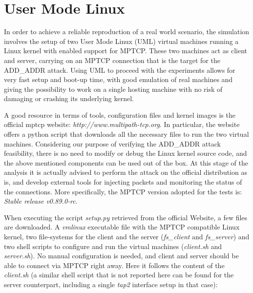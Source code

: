 \section{User Mode Linux}
In order to achieve a reliable reproduction of a real world scenario, the simulation involves the setup of two User Mode Linux (UML) virtual machines running a Linux kernel with enabled support for MPTCP. These two machines act as client and server, carrying on an MPTCP connection that is the target for the ADD\_ADDR attack. 
Using UML to proceed with the experiments allows for very fast setup and boot-up time, with good emulation of real machines and giving the possibility to work on a single hosting machine with no risk of damaging or crashing its underlying kernel.

A good resource in terms of tools, configuration files and kernel images is the official mptcp website:
\textit{http://www.multipath-tcp.org}. In particular, the website offers a python script that downloads all the necessary files to run the two virtual machines. Considering our purpose of verifying the ADD\_ADDR attack feasibility, there is no need to modify or debug the Linux kernel source code, and the above mentioned components can be used out of the box. At this stage of the analysis it is actually advised to perform the attack on the official distribution as is, and develop external tools for injecting packets and monitoring the status of the connections. More specifically, the MPTCP version adopted for the tests is: \textit{Stable release v0.89.0-rc}.

When executing the script \textit{setup.py} retrieved from the official Website, a few files are downloaded. A \textit{vmlinux} executable file with the MPTCP compatible Linux kernel, two file-systems for the client and the server (\textit{fs\_client} and \textit{fs\_server}) and two shell scripts to configure and run the virtual machines (\textit{client.sh} and \textit{server.sh}). No manual configuration is needed, and client and server should be able to connect via MPTCP right away.
Here it follows the content of the \textit{client.sh} (a similar shell script that is not reported here can be found for the server counterpart, including a single \textit{tap2} interface setup in that case):


